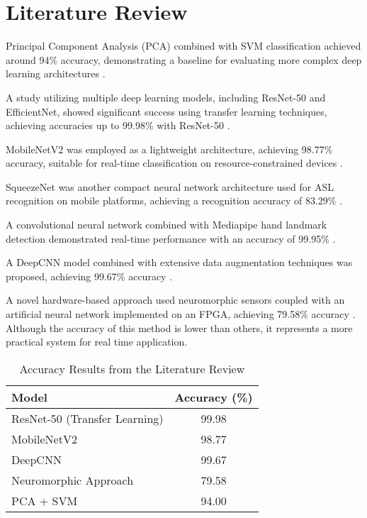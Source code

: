 \documentclass[12pt, a4paper]{article}
\begin{document}
\section{Literature Review}
Principal Component Analysis (PCA) combined with SVM classification achieved around 94\% accuracy, demonstrating a baseline for evaluating more complex deep learning architectures \cite{mdpi2023resnet}.

A study utilizing multiple deep learning models, including ResNet-50 and EfficientNet, showed significant success using transfer learning techniques, achieving accuracies up to 99.98\% with ResNet-50 \cite{mdpi2023resnet}.

MobileNetV2 was employed as a lightweight architecture, achieving 98.77\% accuracy, suitable for real-time classification on resource-constrained devices \cite{techscience2022mobilenet}.

SqueezeNet was another compact neural network architecture used for ASL recognition on mobile platforms, achieving a recognition accuracy of 83.29\% \cite{arxiv2019squeezenet}.

A convolutional neural network combined with Mediapipe hand landmark detection demonstrated real-time performance with an accuracy of 99.95\% \cite{arxiv2023cnnmediapipe}.

A DeepCNN model combined with extensive data augmentation techniques was proposed, achieving 99.67\% accuracy \cite{ncbi2022deepcnn}.

A novel hardware-based approach used neuromorphic sensors coupled with an artificial neural network implemented on an FPGA, achieving 79.58\% accuracy \cite{mdpi2017neuromorphic}. Although the accuracy of this method is lower than others, it represents a more practical system for real time application.


\begin{table}[H]
\centering
\caption{Accuracy Results from the Literature Review}
\label{tab:litreview}
\begin{tabular}{|l|c|}
\hline
Model & Accuracy (\%) \\
\hline
ResNet-50 (Transfer Learning) \cite{mdpi2023resnet} & 99.98 \\
MobileNetV2 \cite{techscience2022mobilenet} & 98.77 \\
DeepCNN \cite{ncbi2022deepcnn} & 99.67 \\
Neuromorphic Approach \cite{mdpi2017neuromorphic} & 79.58 \\
PCA + SVM \cite{mdpi2023resnet} & 94.00 \\
\hline
\end{tabular}
\end{table}


\end{document}
